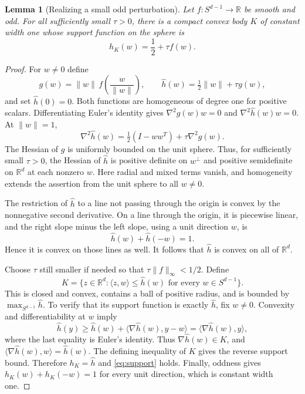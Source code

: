 \documentclass[11pt,reqno]{amsart}
\newtheorem{lemma}[lemma]{Lemma}
\theoremstyle{definition}
\theoremstyle{remark}
\numberwithin{equation}{section}
\newcommand{\R}{\mathbb R}
\newcommand{\ip}[2]{\langle #1,#2\rangle}
\newcommand{\norm}[1]{\lVert #1\rVert}
\begin{document}
\begin{lemma}[Realizing a small odd perturbation]\label{lem:support}
Let $f:S^{d-1}\to\R$ be smooth and odd. For all sufficiently small
$\tau>0$, there is a compact convex body $K$ of constant width one
whose support function on the sphere is
\begin{equation}\label{eq:support}
 h_K(w)=\frac12+\tau f(w).
\end{equation}
\end{lemma}
\begin{proof}
For $w\ne0$ define
\[
 g(w)=\norm w\,f\!\left(\frac w{\norm w}\right),\qquad
 \widehat h(w)=\tfrac12\norm w+\tau g(w),
\]
and set $\widehat h(0)=0$. Both functions are homogeneous of degree
one for positive scalars. Differentiating Euler's identity gives
$\nabla^2g(w)w=0$ and $\nabla^2\widehat h(w)w=0$.
At $\norm w=1$,
\[
 \nabla^2\widehat h(w)
    =\tfrac12(I-ww^T)+\tau\nabla^2g(w).
\]
The Hessian of $g$ is uniformly bounded on the unit sphere. Thus,
for sufficiently small $\tau>0$, the Hessian of $\widehat h$
is positive definite on $w^\perp$ and positive semidefinite on
$\R^d$ at each nonzero $w$. Here radial and mixed terms vanish,
and homogeneity extends the assertion from the unit sphere to
all $w\ne0$.

The restriction of $\widehat h$ to a line not passing through the
origin is convex by the nonnegative second derivative. On a line
through the origin, it is piecewise linear, and the right slope
minus the left slope, using a unit direction $w$, is
\[
 \widehat h(w)+\widehat h(-w)=1.
\]
Hence it is convex on those lines as well. It follows that
$\widehat h$ is convex on all of $\R^d$.

Choose $\tau$ still smaller if needed so that
$\tau\norm f_\infty<1/2$. Define
\[
 K=\{z\in\R^d:\ip z w\leq\widehat h(w)
                          \text{ for every }w\in S^{d-1}\}.
\]
This is closed and convex, contains a ball of positive radius,
and is bounded by $\max_{S^{d-1}}\widehat h$.
To verify that its support function is exactly $\widehat h$,
fix $w\ne0$. Convexity and differentiability at $w$ imply
\[
 \widehat h(y)\geq\widehat h(w)
     +\ip{\nabla\widehat h(w)}{y-w}
     =\ip{\nabla\widehat h(w)}y,
\]
where the last equality is Euler's identity.
Thus $\nabla\widehat h(w)\in K$, and
$\ip{\nabla\widehat h(w)}w=\widehat h(w)$.
The defining inequality of $K$ gives the reverse support bound.
Therefore $h_K=\widehat h$ and \eqref{eq:support} holds.
Finally, oddness gives $h_K(w)+h_K(-w)=1$ for every unit direction,
which is constant width one.
\end{proof}
\end{document}
